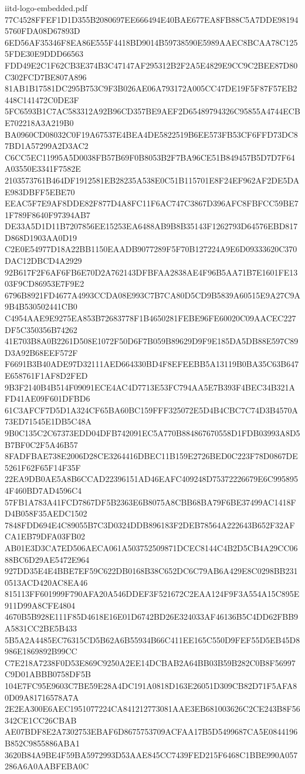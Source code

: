 \begin{filecontents*}[overwrite]{iitd-logo-embedded.pdf}
77C4528FFEF1D1D355B2080697EE666494E40BAE677EA8FB88C5A7DDE981945760FDA08D67893D
6ED56AF35346F8EA86E555F4418BD9014B59738590E5989AAEC8BCAA78C1255FDE30E9DDD66563
FDD49E2C1F62CB3E374B3C47147AF295312B2F2A5E4829E9CC9C2BEE87D80C302FCD7BE807A896
81AB1B17581DC295B753C9F3B026AE06A793172A005CC47DE19F5F87F57EB2448C141472C0DE3F
5FC6593B1C7AC583312A92B96CD357BE9AEF2D65489794326C95855A4744ECBE702218A3A219B0
BA0960CD08032C0F19A67537E4BEA4DE5822519B6EE573FB53CF6FFD73DC87BD1A57299A2D3AC2
C6CC5EC11995A5D0038FB57B69F0B8053B2F7BA96CE51B849457B5D7D7F64A03550E3341F7582E
2103573761B464DF1912581EB28235A538E0C51B115701E8F24EF962AF2DE5DAE983DBFF5EBE70
EEAC5F7E9AF8DDE82F877D4A8FC11F6AC747C3867D396AFC8FBFCC59BE71F789F8640F97394AB7
DE33A5D1D11B7207856EE15253EA6488AB9B8B35143F1262793D64576EBD817D868D1903AA0D19
C2E0E54977D18A22BB1150EAADB9077289F5F70B127224A9E6D09333620C370DAC12DBCD4A2929
92B617F2F6AF6FB6E70D2A762143DFBFAA2838AE4F96B5AA71B7E1601FE1303F9CD86953E7F9E2
6796B8921FD4677A4993CCDA08E993C7B7CA80D5CD9B5839A60515E9A27C9A9B4B530502441CB0
C4954AAE9E9275EA853B72683778F1B4650281FEBE96FE60020C09AACEC227DF5C350356B74262
41E703B8A0B2261D508E1072F50D6F7B059B89629D9F9E185DA5DB88E597C89D3A92B68EEF572F
F6691B3B40ADE97D32111AED664330BD4F8EFEEBB5A13119B0BA35C63B647E658761F1AF8D2FED
9B3F2140B4B514F09091ECE4AC4D7713E53FC794AA5E7B393F4BEC34B321AFD41AE09F601DFBD6
61C3AFCF7D5D1A324CF65BA60BC159FFF325072E5D4B4CBC7C74D3B4570A73ED71545E1DB5C48A
9B0C135C2C67373EDD04DFB742091EC5A770B884867670558D1FDB03993A8D5B7BF0C2F5A46B57
8FADFBAE738E2006D28CE3264416DBEC11B159E2726BED0C223F78D0867DE5261F62F65F14F35F
22EA9DB0AE5A8B6CCAD22396151AD46EAFC409248D75372226679E6C9958954F460BD7AD4596C4
57FB1A783A41FCD7867DF5B2363E6B8075A8CBB68BA79F6BE37499AC1418FD4B058F35AEDC1502
7848FDD694E4C89055B7C3D0324DDB896183F2DEB78564A222643B652F32AFCA1EB79DFA03FB02
AB01E3D3CA7ED506AECA061A503752509871DCEC8144C4B2D5CB4A29CC0688BC6D29AE5472E964
927DD35E4E4BBE7EF59C622DB0168B38C652DC6C79AB6A429E8C0298BB2310513ACD420AC8EA46
815113FF601999F790AFA20A546DDEF3F521672C2EAA124F9F3A554A15C895E911D99A8CFE4804
4670B5B928E111F85D4618E16E01D6742BD26E324033AF46136B5C4DD62FBB9A5831CC2BE5B433
5B5A2A4485EC76315CD5B62A6B55934B66C411EE165C550D9FEF55D5EB45D8986E1869892B99CC
C7E218A7238F0D53E869C9250A2EE14DCBAB2A64BB03B59B282C0B8F56997C9D01ABBB0758DF5B
104E7FC95E9603C7BE59E28A4DC191A0818D163E26051D309CB82D71F5AFA80D09A81716578A7A
2E2EA300E6AEC1951077224CA841212773081AAE3EB681003626C2CE243B8F56342CE1CC26CBAB
AE07BDF8E2A7302753EBAF6D8675753709ACFAA17B5D5499687CA5E0844196B852C9855886ABA1
3620B84A9BE4F59BA5972993D53AAE845CC7439FED215F6468C1BBE990A057286A6A0AABFEBA0C

\end{filecontents*}
